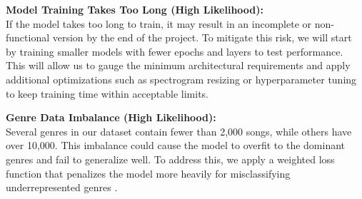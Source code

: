 \documentclass{article} %
\begin{document}
\textbf{Model Training Takes Too Long (High Likelihood):} \\
If the model takes too long to train, it may result in an incomplete or non-functional version by the end of the project. To mitigate this risk, we will start by training smaller models with fewer epochs and layers to test performance. This will allow us to gauge the minimum architectural requirements and apply additional optimizations such as spectrogram resizing or hyperparameter tuning to keep training time within acceptable limits.

\textbf{Genre Data Imbalance (High Likelihood):} \\
Several genres in our dataset contain fewer than 2,000 songs, while others have over 10,000. This imbalance could cause the model to overfit to the dominant genres and fail to generalize well. To address this, we apply a weighted loss function that penalizes the model more heavily for misclassifying underrepresented genres \citep{tantai_weighted}.



\label{last_page}



\end{document}
